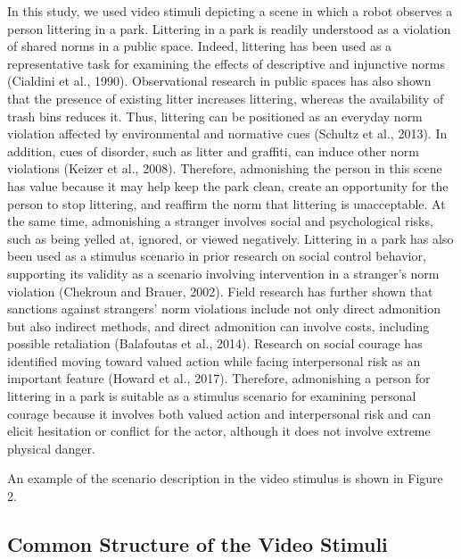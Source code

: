 \documentclass[utf8]{FrontiersinHarvard}
\begin{document}
In this study, we used video stimuli depicting a scene in which a robot observes a person littering in a park. Littering in a park is readily understood as a violation of shared norms in a public space. Indeed, littering has been used as a representative task for examining the effects of descriptive and injunctive norms (Cialdini et al., 1990). Observational research in public spaces has also shown that the presence of existing litter increases littering, whereas the availability of trash bins reduces it. Thus, littering can be positioned as an everyday norm violation affected by environmental and normative cues (Schultz et al., 2013). In addition, cues of disorder, such as litter and graffiti, can induce other norm violations (Keizer et al., 2008). Therefore, admonishing the person in this scene has value because it may help keep the park clean, create an opportunity for the person to stop littering, and reaffirm the norm that littering is unacceptable. At the same time, admonishing a stranger involves social and psychological risks, such as being yelled at, ignored, or viewed negatively. Littering in a park has also been used as a stimulus scenario in prior research on social control behavior, supporting its validity as a scenario involving intervention in a stranger's norm violation (Chekroun and Brauer, 2002). Field research has further shown that sanctions against strangers' norm violations include not only direct admonition but also indirect methods, and direct admonition can involve costs, including possible retaliation (Balafoutas et al., 2014). Research on social courage has identified moving toward valued action while facing interpersonal risk as an important feature (Howard et al., 2017). Therefore, admonishing a person for littering in a park is suitable as a stimulus scenario for examining personal courage because it involves both valued action and interpersonal risk and can elicit hesitation or conflict for the actor, although it does not involve extreme physical danger.

An example of the scenario description in the video stimulus is shown in Figure 2.

\subsection{Common Structure of the Video Stimuli}\label{common-structure-of-the-video-stimuli}
\end{document}
